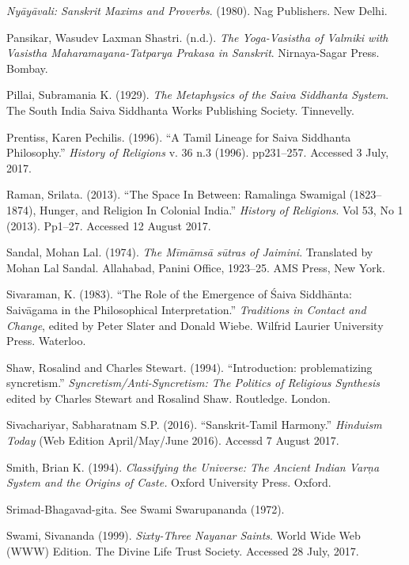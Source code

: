 \begin{thebibliography}{99}
  \textit{Nyāyāvali: Sanskrit Maxims and Proverbs}. (1980). Nag Publishers. New Delhi.

  Pansikar, Wasudev Laxman Shastri. (n.d.). \textit{The Yoga-Vasistha of Valmiki with Vasistha Maharamayana-Tatparya Prakasa in Sanskrit}. Nirnaya-Sagar Press. Bombay.

  Pillai, Subramania K. (1929). \textit{The Metaphysics of the Saiva Siddhanta System}. The South India Saiva Siddhanta Works Publishing Society. Tinnevelly.

  Prentiss, Karen Pechilis. (1996). “A Tamil Lineage for Saiva Siddhanta Philosophy.” \textit{History of Religions} v. 36 n.3 (1996). pp231–257. Accessed 3 July, 2017.

  Raman, Srilata. (2013). “The Space In Between: Ramalinga Swamigal (1823–1874), Hunger, and Religion In Colonial India.” \textit{History of Religions}. Vol 53, No 1 (2013). Pp1–27. Accessed 12 August 2017.

  Sandal, Mohan Lal. (1974). \textit{The Mīmāmsā sūtras of Jaimini}. Translated by Mohan Lal Sandal. Allahabad, Panini Office, 1923–25. AMS Press, New York.

  Sivaraman, K. (1983). “The Role of the Emergence of Śaiva Siddhānta: Saivāgama in the Philosophical Interpretation.” \textit{Traditions in Contact and Change}, edited by Peter Slater and Donald Wiebe. Wilfrid Laurier University Press. Waterloo.

  Shaw, Rosalind and Charles Stewart. (1994). “Introduction: problematizing syncretism.” \textit{Syncretism/Anti-Syncretism: The Politics of Religious Synthesis} edited by Charles Stewart and Rosalind Shaw. Routledge. London.

  Sivachariyar, Sabharatnam S.P. (2016). “Sanskrit-Tamil Harmony.” \textit{Hinduism Today} (Web Edition April/May/June 2016). Accessd 7 August 2017.

  Smith, Brian K. (1994). \textit{Classifying the Universe: The Ancient Indian Varṇa System and the Origins of Caste.} Oxford University Press. Oxford.

  Srimad-Bhagavad-gita. See Swami Swarupananda (1972).

  Swami, Sivananda (1999). \textit{Sixty-Three Nayanar Saints}. World Wide Web (WWW) Edition. The Divine Life Trust Society. Accessed 28 July, 2017.


\end{thebibliography}
